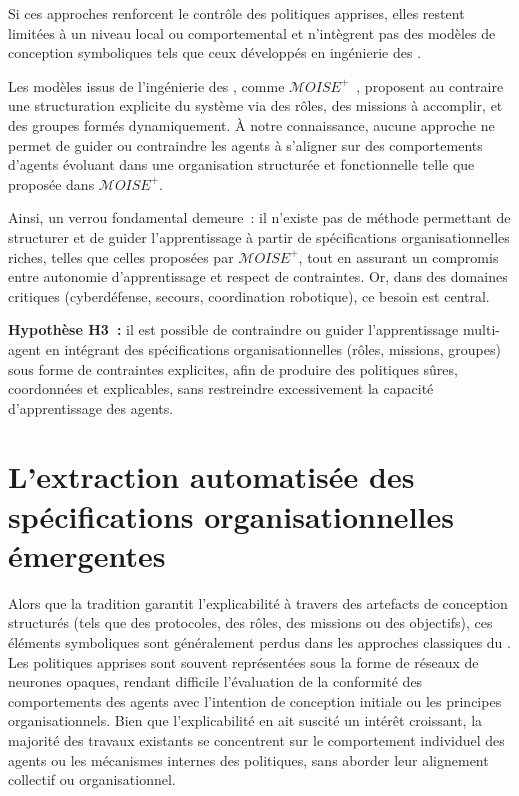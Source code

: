\medskip

\noindent
Si ces approches renforcent le contrôle des politiques apprises, elles restent limitées à un niveau local ou comportemental et n'intègrent pas des modèles de conception symboliques tels que ceux développés en ingénierie des .

\medskip

\noindent
Les modèles issus de l'ingénierie des , comme \textit{$\mathcal{M}OISE^+$}~\cite{hubner2002moise}, proposent au contraire une structuration explicite du système via des rôles, des missions à accomplir, et des groupes formés dynamiquement. À notre connaissance, aucune approche ne permet de guider ou contraindre les agents à s'aligner sur des comportements d'agents évoluant dans une organisation structurée et fonctionnelle telle que proposée dans $\mathcal{M}OISE^+$.



\medskip

\noindent
Ainsi, un verrou fondamental demeure~: il n'existe pas de méthode permettant de structurer et de guider l'apprentissage  à partir de spécifications organisationnelles riches, telles que celles proposées par $\mathcal{M}OISE^+$, tout en assurant un compromis entre autonomie d'apprentissage et respect de contraintes. Or, dans des domaines critiques (cyberdéfense, secours, coordination robotique), ce besoin est central.

\medskip

\noindent
\textbf{Hypothèse H3~:} il est possible de contraindre ou guider l'apprentissage multi-agent en intégrant des spécifications organisationnelles (rôles, missions, groupes) sous forme de contraintes explicites, afin de produire des politiques sûres, coordonnées et explicables, sans restreindre excessivement la capacité d'apprentissage des agents.


\section{L'extraction automatisée des spécifications organisationnelles émergentes}

Alors que la tradition  garantit l'explicabilité à travers des artefacts de conception structurés (tels que des protocoles, des rôles, des missions ou des objectifs), ces éléments symboliques sont généralement perdus dans les approches classiques du . Les politiques apprises sont souvent représentées sous la forme de réseaux de neurones opaques, rendant difficile l'évaluation de la conformité des comportements des agents avec l'intention de conception initiale ou les principes organisationnels. Bien que l'explicabilité en  ait suscité un intérêt croissant, la majorité des travaux existants se concentrent sur le comportement individuel des agents ou les mécanismes internes des politiques, sans aborder leur alignement collectif ou organisationnel.

